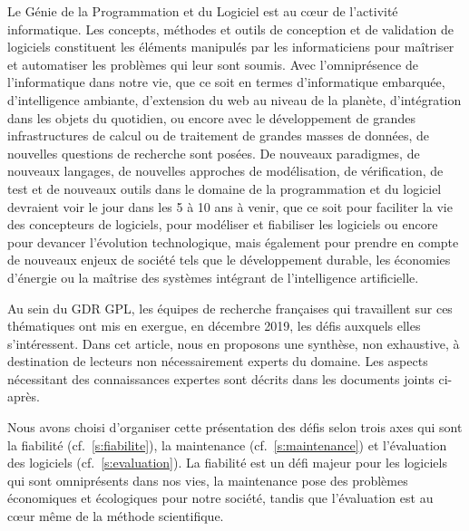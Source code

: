 \documentclass[11pt]{article}
\newcommand{\cf}[0]{cf.~}
\begin{document}
Le Génie de la Programmation et du Logiciel est au c{\oe}ur de l'activité
informatique. Les concepts, méthodes et outils de conception et de
validation de logiciels constituent les éléments manipulés par les
informaticiens pour maîtriser et automatiser les problèmes qui leur sont 
soumis. Avec l'omniprésence de l'informatique dans notre vie,  que ce soit en termes
d'informatique embarquée, d'intelligence ambiante, d'extension du web au niveau
de la planète, d'intégration dans les objets du quotidien, ou encore avec le
développement de grandes infrastructures de calcul ou de traitement de grandes
masses de données, de nouvelles questions de recherche sont posées.
De nouveaux paradigmes, de nouveaux langages, de nouvelles approches de
modélisation, de vérification, de test et de nouveaux outils dans le domaine
de la programmation et du logiciel devraient voir le jour dans les 5 à 10 ans à
venir, que ce soit pour faciliter la vie des concepteurs de logiciels, pour
modéliser et fiabiliser les logiciels ou encore pour devancer l'évolution
technologique, mais également pour prendre en compte de nouveaux enjeux de
société tels que le développement durable, les économies d'énergie ou la maîtrise des systèmes intégrant de l'intelligence artificielle.

Au sein du GDR GPL, les équipes de recherche françaises qui travaillent sur ces thématiques ont mis en exergue, en décembre 2019, les défis auxquels elles s'intéressent. Dans cet article, nous en proposons une synthèse, non exhaustive, à destination de lecteurs non nécessairement experts du domaine. Les aspects %
nécessitant des connaissances expertes sont décrits dans les documents joints ci-après.


Nous avons choisi d'organiser cette présentation des défis selon trois axes qui sont la fiabilité (\cf\ref{s:fiabilite}), la maintenance (\cf\ref{s:maintenance}) et l'évaluation des logiciels (\cf\ref{s:evaluation}). La fiabilité est un défi majeur pour les logiciels qui sont omniprésents dans nos vies, la maintenance pose des problèmes économiques et écologiques pour notre société, tandis que l'évaluation est au c{\oe}ur même de la méthode scientifique.
\end{document}

